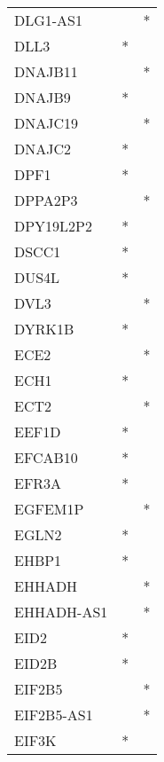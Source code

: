 \begin{longtable}{lcc}
DLG1-AS1         &                &          * \\
DLL3             &              * &            \\
DNAJB11          &                &          * \\
DNAJB9           &              * &            \\
DNAJC19          &                &          * \\
DNAJC2           &              * &            \\
DPF1             &              * &            \\
DPPA2P3          &                &          * \\
DPY19L2P2        &              * &            \\
DSCC1            &              * &            \\
DUS4L            &              * &            \\
DVL3             &                &          * \\
DYRK1B           &              * &            \\
ECE2             &                &          * \\
ECH1             &              * &            \\
ECT2             &                &          * \\
EEF1D            &              * &            \\
EFCAB10          &              * &            \\
EFR3A            &              * &            \\
EGFEM1P          &                &          * \\
EGLN2            &              * &            \\
EHBP1            &              * &            \\
EHHADH           &                &          * \\
EHHADH-AS1       &                &          * \\
EID2             &              * &            \\
EID2B            &              * &            \\
EIF2B5           &                &          * \\
EIF2B5-AS1       &                &          * \\
EIF3K            &              * &            \\

\end{longtable}
